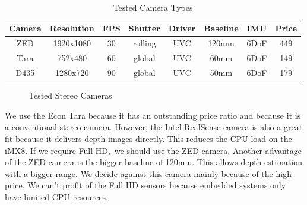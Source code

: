 \documentclass[11pt,a4paper,titlepage,oneside]{report}
\begin{document}
\tiny
\begin{table}[H]
  \centering
  \begin{tabular}{|c|c|c|c|c|c|c|c|}
  Camera & Resolution & FPS & Shutter & Driver & Baseline & IMU & Price \\
  \hline
  ZED & 1920x1080 & 30 & rolling &  UVC & 120mm & 6DoF & 449\\
  Tara & 752x480& 60 & global &  UVC &  60mm & 6DoF & 149\\
  D435 & 1280x720& 90 & global & UVC &  50mm & 6DoF & 179\\
\end{tabular}
\caption{Tested Camera Types}
\label{tab:cameras}
\end{table}
\normalsize

\begin{figure}[H]
  \centering
  \caption{Tested Stereo Cameras}\label{fig:cameras}
\end{figure}


We use the Econ Tara because it has an outstanding price ratio and because it is a conventional stereo camera. However, the Intel RealSense camera is also a great fit because it delivers depth images directly. This reduces the CPU load on the iMX8. If we require Full HD, we should use the ZED camera. Another advantage of the ZED camera is the bigger baseline of 120mm. This allows depth estimation with a bigger range. We decide against this camera mainly because of the high price. We can't profit of the Full HD sensors because embedded systems only have limited CPU resources.
\end{document}

